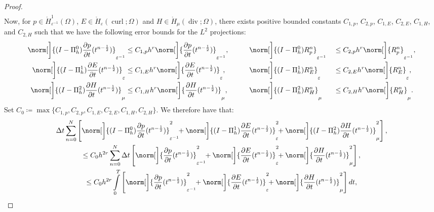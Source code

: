 \documentclass{amsart}
\theoremstyle{thmstyleone}%
\theoremstyle{thmstyletwo}%
\theoremstyle{thmstylethree}%
\DeclareMathOperator{\curl}{curl}
\def\divgn{\operatorname{div}}
\begin{document}
\begin{proof}
\begin{multline*}
\end{multline*}
Now, for $p \in \mathring{H}_{\varepsilon^{-1}}^1(\Omega)$, $E \in \mathring{H}_\varepsilon(\curl; \Omega)$ and $H \in \mathring{H}_\mu(\divgn; \Omega)$, there exists positive bounded constants $C_{1, p}$, $C_{2, p}$, $C_{1, E}$, $C_{2, E}$, $C_{1, H}$, and $C_{2, H}$ such that we have the following error bounds for the $L^2$ projections:
\begin{alignat*}{3}
  \norm[\bigg]{(I - \Pi_h^0) \dfrac{\partial p}{\partial t}(t^{n - \frac{1}{2}})}_{\varepsilon^{-1}} &\le C_{1, p} h^r \norm[\bigg]{\dfrac{\partial p}{\partial t}(t^{n - \frac{1}{2}})}_{\varepsilon^{-1}}, && \qquad \norm[\bigg]{(I - \Pi_h^0) R_p^n}_{\varepsilon^{-1}} &&\le C_{2, p} h^r \norm[\bigg]{R_p^n}_{\varepsilon^{-1}}, \\
  \norm[\bigg]{(I - \Pi_h^1) \dfrac{\partial E}{\partial t}(t^{n - \frac{1}{2}})}_{\varepsilon} &\le C_{1, E} h^r \norm[\bigg]{\dfrac{\partial E}{\partial t}(t^{n - \frac{1}{2}})}_{\varepsilon}, && \qquad \norm[\bigg]{(I - \Pi_h^1) R_E^n}_{\varepsilon} &&\le C_{2, E} h^r \norm[\bigg]{R_E^n}_{\varepsilon}, \\
  \norm[\bigg]{(I - \Pi_h^2) \dfrac{\partial H}{\partial t}(t^{n - \frac{1}{2}})}_{\mu} &\le C_{1, H} h^r \norm[\bigg]{\dfrac{\partial H}{\partial t}(t^{n - \frac{1}{2}})}_{\mu}, && \qquad \norm[\bigg]{(I - \Pi_h^2) R_H^n}_{\mu} &&\le C_{2, H} h^r \norm[\bigg]{R_H^n}_{\mu}.
\end{alignat*}
Set $C_0 \coloneq \max \{C_{1, p}, C_{2, p}, C_{1, E}, C_{2, E}, C_{1, H}, C_{2, H} \}$. We therefore have that:
 \begin{multline*}
    \Delta t \sum\limits_{n = 0}^N \left[ \norm[\bigg]{(I - \Pi_h^0) \dfrac{\partial p}{\partial t}(t^{n - \frac{1}{2}})}^2_{\varepsilon^{-1}} \!\! + \norm[\bigg]{(I - \Pi_h^1) \dfrac{\partial E}{\partial t}(t^{n - \frac{1}{2}})}^2_{\varepsilon} \!\! + \norm[\bigg]{(I - \Pi_h^2) \dfrac{\partial H}{\partial t}(t^{n - \frac{1}{2}})}^2_\mu \right], \\
\le C_0 h^{2 r} \sum\limits_{n = 0}^N \Delta t \left[ \norm[\bigg]{\dfrac{\partial p}{\partial t}(t^{n - \frac{1}{2}})}^2_{\varepsilon^{-1}} \!\! + \norm[\bigg]{\dfrac{\partial E}{\partial t}(t^{n - \frac{1}{2}})}^2_{\varepsilon} \!\! + \norm[\bigg]{\dfrac{\partial H}{\partial t}(t^{n - \frac{1}{2}})}^2_{\mu} \right], \\
\le C_0 h^{2 r} \int\limits_0^T \left[ \norm[\bigg]{\dfrac{\partial p}{\partial t}(t^{n - \frac{1}{2}})}^2_{\varepsilon^{-1}} \!\! + \norm[\bigg]{\dfrac{\partial E}{\partial t}(t^{n - \frac{1}{2}})}^2_{\varepsilon} \!\! + \norm[\bigg]{\dfrac{\partial H}{\partial t}(t^{n - \frac{1}{2}})}^2_{\mu} \right] dt, \\

\end{multline*}
\end{proof}
\end{document}
